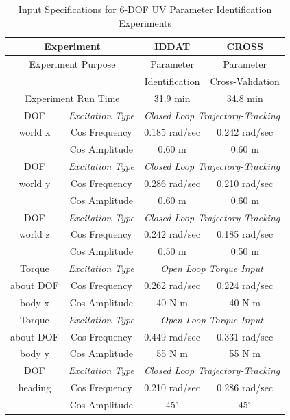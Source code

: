 \begin{table}[htbp]
\ssp
\caption{Input Specifications for 6-\ac{DOF} \ac{UV} Parameter
  Identification Experiments}  
\begin{center}
\begin{tabular}{cccc}
 \multicolumn{2}{c}{Experiment} & \ac{IDDAT}& \ac{CROSS} \\
\hline
\multicolumn{2}{c}{Experiment Purpose}  & Parameter      &  Parameter \\
              &                         & Identification &  Cross-Validation \\
\hline
\multicolumn{2}{c}{Experiment Run Time} &   31.9 min     &   34.8 min    \\ 
\hline
\ac{DOF}      & {\it Excitation Type} & \multicolumn{2}{c}{\it Closed Loop Trajectory-Tracking} \\
world x  &  Cos Frequency  & 0.185 rad/sec & 0.242 rad/sec \\ 
         &  Cos Amplitude  &    0.60 m     &     0.60 m    \\ 
\hline
\ac{DOF}      & {\it Excitation Type} & \multicolumn{2}{c}{\it Closed Loop Trajectory-Tracking} \\
world y  &  Cos Frequency  & 0.286 rad/sec & 0.210 rad/sec \\ 
         &  Cos Amplitude  &    0.60 m     &     0.60 m    \\ 
\hline
\ac{DOF}      & {\it Excitation Type} & \multicolumn{2}{c}{\it Closed Loop Trajectory-Tracking} \\
world z  &  Cos Frequency  & 0.242 rad/sec & 0.185 rad/sec \\ 
         &  Cos Amplitude  &    0.50 m     &     0.50 m    \\ 
\hline
Torque   & {\it Excitation Type} & \multicolumn{2}{c}{\it Open Loop Torque Input} \\
about \ac{DOF}&  Cos Frequency  & 0.262 rad/sec & 0.224 rad/sec \\ 
body x   &  Cos Amplitude  &    40 N m    &     40 N m     \\ 
\hline
Torque   & {\it Excitation Type} & \multicolumn{2}{c}{\it Open Loop Torque Input} \\
about \ac{DOF}&  Cos Frequency  & 0.449 rad/sec & 0.331 rad/sec \\ 
body y   &  Cos Amplitude  &    55 N m    &     55 N m     \\ 
\hline
\ac{DOF}      & {\it Excitation Type} & \multicolumn{2}{c}{\it Closed Loop Trajectory-Tracking} \\
heading  &  Cos Frequency  & 0.210 rad/sec & 0.286 rad/sec \\ 
         &  Cos Amplitude  &    45$^\circ$  &   45$^\circ$   \\ 
\hline \end{tabular}
\end{center}
\label{chUV_AID.tb.UVSE3expStat}
\end{table}



